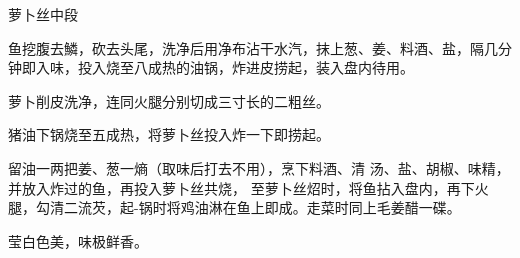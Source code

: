 \begin{recipe}[银丝中段]{萝卜丝中段}

\ingredients



\cooking

\step 鱼挖腹去鱗，砍去头尾，洗净后用净布沾干水汽，抹上葱、姜、料酒、盐，隔几分钟即入味，投入烧至八成热的油锅，炸进皮捞起，装入盘内待用。

\step 萝卜削皮洗净，连同火腿分别切成三寸长的二粗丝。

\step 猪油下锅烧至五成热，将萝卜丝投入炸一下即捞起。

留油一两把姜、葱一熵（取味后打去不用），烹下料酒、清 汤、盐、胡椒、味精，并放入炸过的鱼，再投入萝卜丝共烧， 至萝卜丝炤时，将鱼拈入盘内，再下火腿，勾清二流芡，起-锅时将鸡油淋在鱼上即成。走菜时同上毛姜醋一碟。

\notes

莹白色美，味极鲜香。

\end{recipe}


